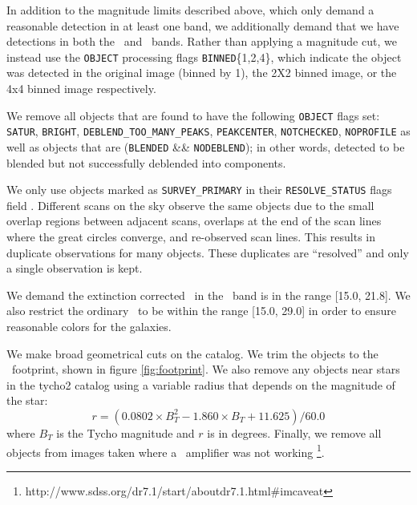\documentclass[preprint]{aastex}
\newcommand{\modelrmin}{15.0}
\newcommand{\modelrmax}{29.0}
\newcommand{\rmin}{15.0}
\newcommand{\rmax}{21.8}
\begin{document}
In addition to the magnitude limits described above, which only demand a
reasonable detection in at least one band, we additionally demand that we have
detections in both the \rmag\ and \imag\ bands.  Rather than applying a
magnitude cut, we instead use the \texttt{OBJECT} processing flags
\texttt{BINNED}\{1,2,4\}, which indicate the object was detected in the original
image (binned by 1), the 2X2 binned image, or the 4x4 binned image respectively.

We remove all objects that are found to have the following \texttt{OBJECT}
flags set: \texttt{SATUR}, \texttt{BRIGHT}, \texttt{DEBLEND\_TOO\_MANY\_PEAKS},
\texttt{PEAKCENTER}, \texttt{NOTCHECKED}, \texttt{NOPROFILE} as well as objects
that are (\texttt{BLENDED} \&\& \texttt{NODEBLEND}); in other words, detected
to be blended but not successfully deblended into components. 

We only use objects marked as \texttt{SURVEY\_PRIMARY} in their
\texttt{RESOLVE\_STATUS} flags field \citep{dr7resolve}. Different scans on the
sky observe the same objects due to the small overlap regions between adjacent
scans, overlaps at the end of the scan lines where the great circles converge,
and re-observed scan lines.  This results in duplicate observations for many
objects.  These duplicates are ``resolved'' and only a single observation is
kept.

We demand the extinction corrected \citep{Schlegel98} \cmodelmag\ in the \rmag\
band is in the range [\rmin, \rmax].  We also restrict the ordinary \modelmag\
to be within the range [\modelrmin, \modelrmax] in order to ensure reasonable
colors for the galaxies.

We make broad geometrical cuts on the catalog.  We trim the objects to the
\boss\ footprint, shown in figure \ref{fig:footprint}. We also remove any
objects near stars in the tycho2 catalog \citep{tycho2} using a variable radius
that depends on the magnitude of the star:
\begin{equation}
r = (0.0802\times B_T^2 - 1.860\times B_T + 11.625)/60.0
\end{equation}
where $B_T$ is the Tycho magnitude and $r$ is in degrees.  Finally, we remove
all objects from images taken where a \umag\ amplifier was not working
\footnote{http://www.sdss.org/dr7.1/start/aboutdr7.1.html\#imcaveat}.
\end{document}
